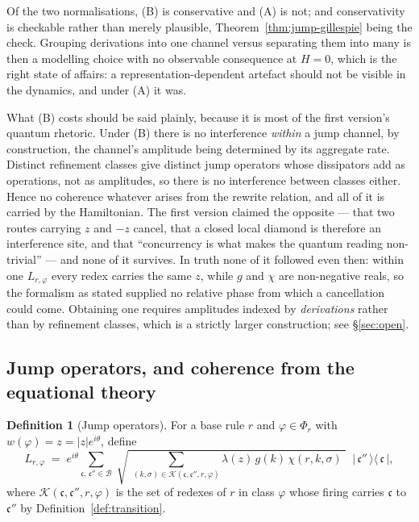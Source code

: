 \documentclass[11pt,a4paper]{article}
\theoremstyle{plain}
\theoremstyle{definition}
\newtheorem{definition}[theorem]{Definition}
\theoremstyle{remark}
\newcommand{\wmap}{w}
\newcommand{\gfac}{g}
\newcommand{\Lop}{L}
\begin{document}
Of the two normalisations, (B) is conservative and (A) is not; and conservativity is checkable rather
than merely plausible, Theorem~\ref{thm:jump-gillespie} being the check. Grouping derivations into
one channel versus separating them into many is then a modelling choice with no observable
consequence at $H = 0$, which is the right state of affairs: a representation-dependent artefact
should not be visible in the dynamics, and under (A) it was.

What (B) costs should be said plainly, because it is most of the first version's quantum rhetoric.
Under (B) there is no interference \emph{within} a jump channel, by construction, the channel's
amplitude being determined by its aggregate rate. Distinct refinement classes give distinct jump
operators whose dissipators add as operations, not as amplitudes, so there is no interference between
classes either. Hence no coherence whatever arises from the rewrite relation, and all of it is
carried by the Hamiltonian. The first version claimed the opposite --- that two routes carrying $z$
and $-z$ cancel, that a closed local diamond is therefore an interference site, and that
``concurrency is what makes the quantum reading non-trivial'' --- and none of it survives. In truth
none of it followed even then: within one $\Lop_{r,\varphi}$ every redex carries the same $z$, while
$\gfac$ and $\chi$ are non-negative reals, so the formalism as stated supplied no relative phase from
which a cancellation could come. Obtaining one requires amplitudes indexed by \emph{derivations}
rather than by refinement classes, which is a strictly larger construction; see \S\ref{sec:open}.

\subsection{Jump operators, and coherence from the equational theory}
\label{sec:qgen}

\begin{definition}[Jump operators]
\label{def:jump}
For a base rule $r$ and $\varphi \in \Phi_r$ with $\wmap(\varphi) = z = |z|e^{i\theta}$, define
\[
\Lop_{r,\varphi} \;=\; e^{i\theta}\!\!\!\sum_{\mathfrak{c},\,\mathfrak{c}'' \in \mathcal{B}}\;
\sqrt{\;\sum_{(k,\sigma) \in \mathcal{K}(\mathfrak{c},\mathfrak{c}'',r,\varphi)}
\!\!\!\lambda(z)\,\gfac(k)\,\chi(r,k,\sigma)\;}\;\;
\big|\,\mathfrak{c}''\,\big\rangle \big\langle\, \mathfrak{c} \,\big| ,
\]
where $\mathcal{K}(\mathfrak{c},\mathfrak{c}'',r,\varphi)$ is the set of redexes of $r$ in class
$\varphi$ whose firing carries $\mathfrak{c}$ to $\mathfrak{c}''$ by
Definition~\ref{def:transition}.
\end{definition}
\end{document}

